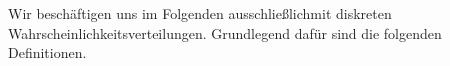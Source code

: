 \documentclass[11pt,a4paper]{article}
\numberwithin{equation}{section}
\begin{document}
	Wir beschäftigen uns im Folgenden ausschließlichmit diskreten Wahrscheinlichkeitsverteilungen. Grundlegend dafür sind die folgenden Definitionen.

\end{document}
